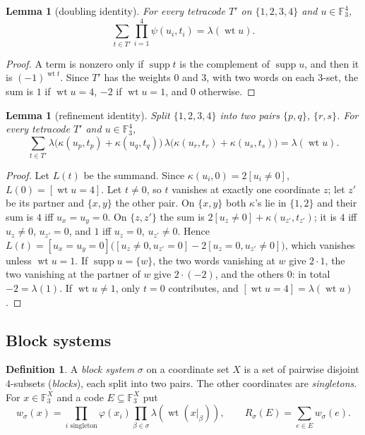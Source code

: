 \documentclass[11pt]{amsart}
\newtheorem{lemma}[theorem]{Lemma}
\theoremstyle{definition}
\newtheorem{definition}[theorem]{Definition}
\newcommand{\F}{\mathbb{F}_3}
\newcommand{\wt}{\operatorname{wt}}
\newcommand{\supp}{\operatorname{supp}}
\begin{document}
\begin{lemma}[doubling identity]\label{lem:A}
For every tetracode $T'$ on $\{1,2,3,4\}$ and $u\in\F^4$,
\[
  \sum_{t\in T'}\prod_{i=1}^4\psi(u_i,t_i)=\lambda(\wt u).
\]
\end{lemma}

\begin{proof}
A term is nonzero only if $\supp t$ is the complement of $\supp u$, and then it is
$(-1)^{\wt t}$. Since $T'$ has the weights $0$ and $3$, with two words on each $3$-set, the sum is
$1$ if $\wt u=4$, $-2$ if $\wt u=1$, and $0$ otherwise.
\end{proof}

\begin{lemma}[refinement identity]\label{lem:B}
Split $\{1,2,3,4\}$ into two pairs $\{p,q\}$, $\{r,s\}$. For every tetracode $T'$ and $u\in\F^4$,
\[
  \sum_{t\in T'}\lambda\bigl(\kappa(u_p,t_p)+\kappa(u_q,t_q)\bigr)\,
  \lambda\bigl(\kappa(u_r,t_r)+\kappa(u_s,t_s)\bigr)=\lambda(\wt u).
\]
\end{lemma}

\begin{proof}
Let $L(t)$ be the summand. Since $\kappa(u_i,0)=2[u_i\ne0]$, $L(0)=[\wt u=4]$. Let $t\ne0$, so $t$
vanishes at exactly one coordinate $z$; let $z'$ be its partner and $\{x,y\}$ the other pair. On
$\{x,y\}$ both $\kappa$'s lie in $\{1,2\}$ and their sum is $4$ iff $u_x=u_y=0$. On $\{z,z'\}$ the
sum is $2[u_z\ne0]+\kappa(u_{z'},t_{z'})$; it is $4$ iff $u_z\ne0$, $u_{z'}=0$, and $1$ iff $u_z=0$,
$u_{z'}\ne0$. Hence
$L(t)=[u_x=u_y=0]\bigl([u_z\ne0,u_{z'}=0]-2[u_z=0,u_{z'}\ne0]\bigr)$, which vanishes unless
$\wt u=1$. If $\supp u=\{w\}$, the two words vanishing at $w$ give $2\cdot1$, the two vanishing at
the partner of $w$ give $2\cdot(-2)$, and the others $0$: in total $-2=\lambda(1)$. If $\wt u\ne1$,
only $t=0$ contributes, and $[\wt u=4]=\lambda(\wt u)$.
\end{proof}

\subsection{Block systems}

\begin{definition}\label{def:R}
A \emph{block system} $\sigma$ on a coordinate set $X$ is a set of pairwise disjoint $4$-subsets
(\emph{blocks}), each split into two pairs. The other coordinates are \emph{singletons}. For
$x\in\F^X$ and a code $E\subseteq\F^X$ put
\[
  w_\sigma(x)=\prod_{i\text{ singleton}}\varphi(x_i)\prod_{\beta\in\sigma}\lambda(\wt(x|_\beta)),
  \qquad R_\sigma(E)=\sum_{e\in E}w_\sigma(e).
\]
\end{definition}
\end{document}
